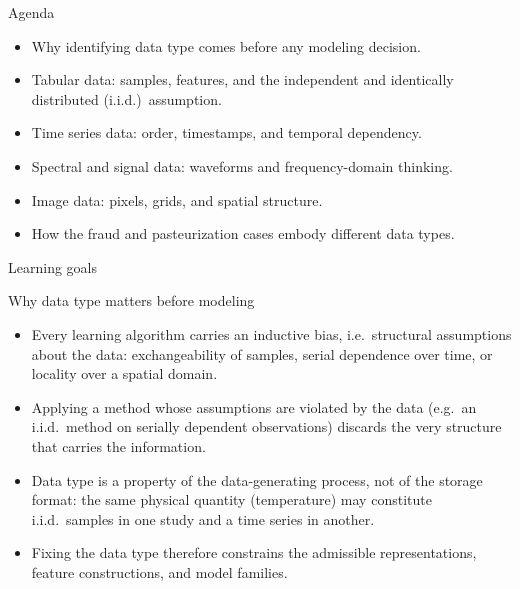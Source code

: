 \begin{frame}{Agenda}
\begin{itemize}
\item Why identifying data type comes before any modeling decision.
\item Tabular data: samples, features, and the independent and identically distributed (i.i.d.)\ assumption.
\item Time series data: order, timestamps, and temporal dependency.
\item Spectral and signal data: waveforms and frequency-domain thinking.
\item Image data: pixels, grids, and spatial structure.
\item How the fraud and pasteurization cases embody different data types.
\end{itemize}
\coursefooter
\end{frame}

\begin{frame}{Learning goals}
\coursefooter
\end{frame}
\begin{frame}{Why data type matters before modeling}
\begin{itemize}
\item Every learning algorithm carries an inductive bias, i.e.\ structural assumptions about the data: exchangeability of samples, serial dependence over time, or locality over a spatial domain.
\item Applying a method whose assumptions are violated by the data (e.g.\ an i.i.d.\ method on serially dependent observations) discards the very structure that carries the information.
\item Data type is a property of the data-generating process, not of the storage format: the same physical quantity (temperature) may constitute i.i.d.\ samples in one study and a time series in another.
\item Fixing the data type therefore constrains the admissible representations, feature constructions, and model families.
\end{itemize}
\coursefooter
\end{frame}

